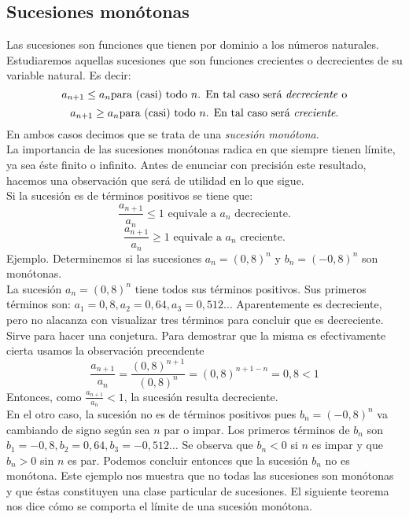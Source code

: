 \documentclass[../Teoría.root.tex]{subfiles}
\begin{document}
\subsection{Sucesiones monótonas}
Las sucesiones son funciones que tienen por dominio a los números naturales.
Estudiaremos aquellas sucesiones que son funciones crecientes o decrecientes de su variable natural.
Es decir:
\[a_{n+1}\leq a_n \text{para (casi) todo \(n\). En tal caso será \textit{decreciente} o}\]
\[a_{n+1}\geq a_n \text{para (casi) todo \(n\). En tal caso será \textit{creciente}.}\]
En ambos casos decimos que se trata de una \textit{sucesión monótona}.\\
La importancia de las sucesiones monótonas radica en que siempre tienen límite, ya sea éste finito o infinito.
Antes de enunciar con precisión este resultado, hacemos una observación que será de utilidad en lo que sigue.\\
Si la sucesión es de términos positivos se tiene que:
\[\frac{a_{n+1}}{a_n}\leq1\text{ equivale a \(a_n\) decreciente.}\]
\[\frac{a_{n+1}}{a_n}\geq1\text{ equivale a \(a_n\) creciente.}\]
Ejemplo. Determinemos si las sucesiones \(a_n=(0,8)^n\) y \(b_n=(-0,8)^n\) son monótonas.\\
La sucesión \(a_n=(0,8)^n\) tiene todos sus términos positivos.
Sus primeros términos son: \(a_1=0,8, a_2=0,64, a_3=0,512\dots\) Aparentemente es decreciente, pero no alacanza con visualizar tres términos para concluir que es decreciente.
Sirve para hacer una conjetura.
Para demostrar que la misma es efectivamente cierta usamos la observación precendente
\[\frac{a_{n+1}}{a_n}=\frac{(0,8)^{n+1}}{(0,8)^n}=(0,8)^{n+1-n}=0,8<1\]
Entonces, como \(\frac{a_{n+1}}{a_n}<1\), la sucesión resulta decreciente.\\
En el otro caso, la sucesión no es de términos positivos pues \(b_n=(-0,8)^n\) va cambiando de signo según sea \(n\) par o impar.
Los primeros términos de \(b_n\) son \(b_1=-0,8, b_2=0,64, b_3=-0,512\dots\) Se observa que \(b_n<0\) si \(n\) es impar y que \(b_n>0\) sin \(n\) es par.
Podemos concluir entonces que la sucesión \(b_n\) no es monótona.
Este ejemplo nos muestra que no todas las sucesiones son monótonas y que éstas constituyen una clase particular de sucesiones.
El siguiente teorema nos dice cómo se comporta el límite de una sucesión monótona.
\end{document}
